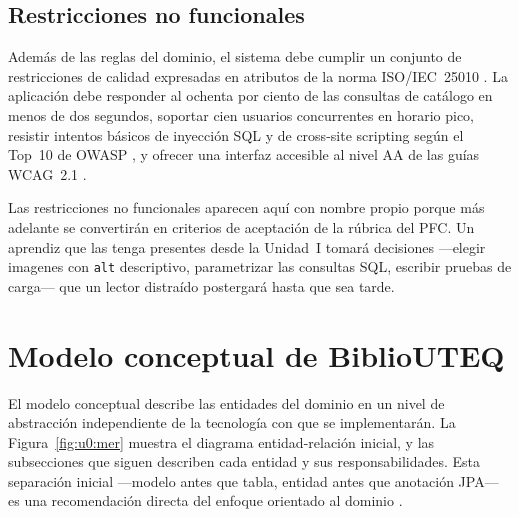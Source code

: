 \subsection{Restricciones no funcionales}
\label{sec:u0:dominio:rnf}

Adem\'as de las reglas del dominio, el sistema debe cumplir un conjunto de restricciones de calidad expresadas en atributos de la norma ISO/IEC~25010 \cite{iso25010}. La aplicaci\'on debe responder al ochenta por ciento de las consultas de cat\'alogo en menos de dos segundos, soportar cien usuarios concurrentes en horario pico, resistir intentos b\'asicos de inyecci\'on SQL y de cross-site scripting seg\'un el Top~10 de OWASP \cite{owasp2021top10}, y ofrecer una interfaz accesible al nivel AA de las gu\'ias WCAG~2.1 \cite{w3c2018wcag21}.

Las restricciones no funcionales aparecen aqu\'i con nombre propio porque m\'as adelante se convertir\'an en criterios de aceptaci\'on de la r\'ubrica del PFC. Un aprendiz que las tenga presentes desde la Unidad~I tomar\'a decisiones ---elegir imagenes con \texttt{alt} descriptivo, parametrizar las consultas SQL, escribir pruebas de carga--- que un lector distra\'ido postergar\'a hasta que sea tarde.

\section{Modelo conceptual de BiblioUTEQ}
\label{sec:u0:modelo}

El modelo conceptual describe las entidades del dominio en un nivel de abstracci\'on independiente de la tecnolog\'ia con que se implementar\'an. La Figura~\ref{fig:u0:mer} muestra el diagrama entidad-relaci\'on inicial, y las subsecciones que siguen describen cada entidad y sus responsabilidades. Esta separaci\'on inicial ---modelo antes que tabla, entidad antes que anotaci\'on JPA--- es una recomendaci\'on directa del enfoque orientado al dominio \cite{evans2003ddd}.

